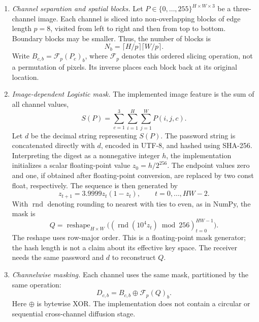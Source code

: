 \documentclass[a4paper,fleqn]{cas-dc}
\theoremstyle{plain}
\theoremstyle{definition}
\begin{document}
\begin{enumerate}
\item \textit{Channel separation and spatial blocks.}
Let $P\in\{0,\ldots,255\}^{H\times W\times 3}$ be a three-channel image. Each channel is sliced into non-overlapping blocks of edge length $p=8$, visited from left to right and then from top to bottom. Boundary blocks may be smaller. Thus, the number of blocks is
\begin{equation}
N_b=\lceil H/p\rceil\lceil W/p\rceil.
\end{equation}
Write $B_{c,b}=\mathcal F_p(P_c)_b$, where $\mathcal F_p$ denotes this ordered slicing operation, not a permutation of pixels. Its inverse places each block back at its original location.

\item \textit{Image-dependent Logistic mask.}
The implemented image feature is the sum of all channel values,
\begin{equation}
S(P)=\sum_{c=1}^{3}\sum_{i=1}^{H}\sum_{j=1}^{W}P(i,j,c).
\end{equation}
Let $d$ be the decimal string representing $S(P)$. The password string is concatenated directly with $d$, encoded in UTF-8, and hashed using SHA-256. Interpreting the digest as a nonnegative integer $h$, the implementation initializes a scalar floating-point value $z_0=h/2^{256}$. The endpoint values zero and one, if obtained after floating-point conversion, are replaced by two const float, respectively. The sequence is then generated by
\begin{equation}
z_{t+1}=3.9999z_t(1-z_t),\qquad t=0,\ldots,HW-2.
\end{equation}
With $\operatorname{rnd}$ denoting rounding to nearest with ties to even, as in NumPy, the mask is
\begin{equation}
Q=\operatorname{reshape}_{H\times W}
\bigl((\operatorname{rnd}(10^4z_t)\bmod256)_{t=0}^{HW-1}\bigr).
\end{equation}
The reshape uses row-major order. This is a floating-point mask generator; the hash length is not a claim about its effective key space. The receiver needs the same password and $d$ to reconstruct $Q$.

\item \textit{Channelwise masking.}
Each channel uses the same mask, partitioned by the same operation:
\begin{equation}
D_{c,b}=B_{c,b}\oplus\mathcal F_p(Q)_b.
\end{equation}
Here $\oplus$ is bytewise XOR. The implementation does not contain a circular or sequential cross-channel diffusion stage.


\end{enumerate}
\end{document}
